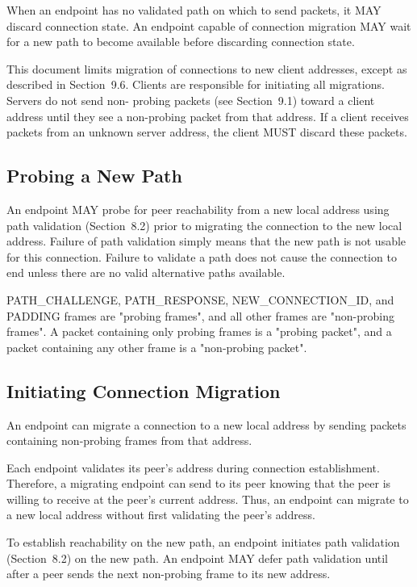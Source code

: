 \documentclass{article}
\begin{document}
When an endpoint has no validated path on which to send packets, it MAY discard connection state.  An endpoint capable of connection migration MAY wait for a new path to become available before discarding connection state.

This document limits migration of connections to new client addresses, except as described in Section~9.6.  Clients are responsible for initiating all migrations.  Servers do not send non- probing packets (see Section~9.1) toward a client address until they see a non-probing packet from that address.  If a client receives packets from an unknown server address, the client MUST discard these packets.

\subsection{Probing a New Path}

An endpoint MAY probe for peer reachability from a new local address using path validation (Section~8.2) prior to migrating the connection to the new local address.  Failure of path validation simply means that the new path is not usable for this connection.  Failure to validate a path does not cause the connection to end unless there are no valid alternative paths available.

PATH\_CHALLENGE, PATH\_RESPONSE, NEW\_CONNECTION\_ID, and PADDING frames are "probing frames", and all other frames are "non-probing frames". A packet containing only probing frames is a "probing packet", and a packet containing any other frame is a "non-probing packet".

\subsection{Initiating Connection Migration}

An endpoint can migrate a connection to a new local address by sending packets containing non-probing frames from that address.

Each endpoint validates its peer's address during connection establishment.  Therefore, a migrating endpoint can send to its peer knowing that the peer is willing to receive at the peer's current address.  Thus, an endpoint can migrate to a new local address without first validating the peer's address.

To establish reachability on the new path, an endpoint initiates path validation (Section~8.2) on the new path.  An endpoint MAY defer path validation until after a peer sends the next non-probing frame to its new address.
\end{document}
